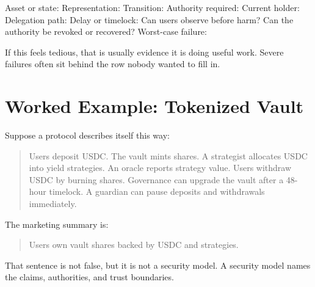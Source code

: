 \begin{codeblock}
Asset or state:
Representation:
Transition:
Authority required:
Current holder:
Delegation path:
Delay or timelock:
Can users observe before harm?
Can the authority be revoked or recovered?
Worst-case failure:
\end{codeblock}

If this feels tedious, that is usually evidence it is doing useful work. Severe failures often sit behind the row nobody wanted to fill in.

\section{Worked Example: Tokenized Vault}

Suppose a protocol describes itself this way:

\begin{quote}
Users deposit USDC. The vault mints shares. A strategist allocates USDC into yield strategies. An oracle reports strategy value. Users withdraw USDC by burning shares. Governance can upgrade the vault after a 48-hour timelock. A guardian can pause deposits and withdrawals immediately.
\end{quote}

The marketing summary is:

\begin{quote}
Users own vault shares backed by USDC and strategies.
\end{quote}

That sentence is not false, but it is not a security model. A security model names the claims, authorities, and trust boundaries.

